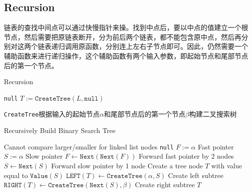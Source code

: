  \subsection{Recursion}
 链表的查找中间点可以通过快慢指针来操。找到中点后，要以中点的值建立一个根节点，然后需要把原链表断开，分为前后两个链表，都不能包含原中点，然后再分别对这两个链表递归调用原函数，分别连上左右子节点即可。因此，仍然需要一个辅助函数来进行递归操作，这个辅助函数有两个输入参数，即起始节点和尾部节点后的第一个节点。
\setcounter{algorithm}{0}
\begin{algorithm}[H]
\caption{Recursion}
\begin{algorithmic}[1]
\State \Return \texttt{null}
\EndIf
\State $T:=\texttt{CreateTree}(L, \texttt{null})$
\EndProcedure
\end{algorithmic}
\end{algorithm}
 \texttt{CreateTree}根据输入的起始节点$\alpha$和尾部节点后的第一个节点$\beta$构建二叉搜索树
\begin{algorithm}[H]
\caption{Recursively Build Binary Search Tree}
\begin{algorithmic}[1]
\If{$\alpha=\beta$} \Comment Cannot compare larger/smaller for linked list nodes
\State \Return \texttt{null}
\EndIf
\State $F:=\alpha$ \Comment Fast pointer
\State $S:=\alpha$ \Comment Slow pointer
\State $F\gets \texttt{Next}(\texttt{Next}(F))$ \Comment Forward fast pointer by 2 nodes
\State $S\gets \texttt{Next}(S)$ \Comment Forward slow pointer by 1 node
\EndWhile
\State Create a tree node $T$ with value equal to $\texttt{Value}(S)$ 
\State $\texttt{LEFT}(T)\gets \texttt{CreateTree}(\alpha, S)$ \Comment Create left subtree
\State $\texttt{RIGHT}(T)\gets \texttt{CreateTree}(\texttt{Next}(S), \beta)$ \Comment Create right subtree
\State \Return $T$
\EndFunction
\end{algorithmic}
\end{algorithm} 